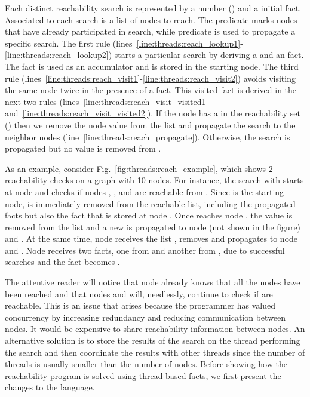 Each distinct reachability search is represented by a number () and a
 initial fact. Associated to each search  is a list of
nodes to reach. The predicate  marks nodes that have already
participated in search, while predicate  is used to propagate a
specific search. The first rule
(lines~\ref{line:threads:reach_lookup1}-\ref{line:threads:reach_lookup2}) starts
a particular search by deriving a  and an  fact.
The  fact is used as an accumulator and is stored in the starting
node. The third rule
(lines~\ref{line:threads:reach_visit1}-\ref{line:threads:reach_visit2}) avoids
visiting the same node twice in the presence of a  fact.  This
visited fact is derived in the next two rules
(lines~\ref{line:threads:reach_visit_visited1}
and~\ref{line:threads:reach_visit_visited2}).  If the node has a  in
the reachability set () then we remove the node value from the
list and propagate the search to the neighbor nodes
(line~\ref{line:threads:reach_propagate}).  Otherwise, the search is propagated
but no value is removed from .

As an example, consider Fig.~\ref{fig:threads:reach_example}, which shows 2
reachability checks on a graph with 10 nodes. For instance, the search with
 starts at node  and checks if nodes , ,
and  are reachable from . Since  is the starting
node,  is immediately removed from the reachable list, including the
propagated  facts but also the  fact that is stored
at node . Once  reaches node , the value
 is removed from the list and a new  is propagated to
node  (not shown in the figure) and . At the same time, node
 receives the list \code{[2,3]}, removes  and propagates
\code{[3]} to node  and . Node  receives two
 facts, one from  and another from , due to
successful searches and the  fact becomes .

The attentive reader will notice that node  already knows that all the
nodes have been reached and that nodes  and  will, needlessly,
continue to check if \code{[2,3]} are reachable. This is an issue that arises
because the programmer has valued concurrency by increasing redundancy and
reducing communication between nodes. It would be expensive to share
reachability information between nodes. An alternative solution is to store the
results of the search on the thread performing the search and then coordinate
the results with other threads since the number of threads is usually smaller
than the number of nodes. Before showing how the reachability program is solved
using thread-based facts, we first present the changes to the language.


